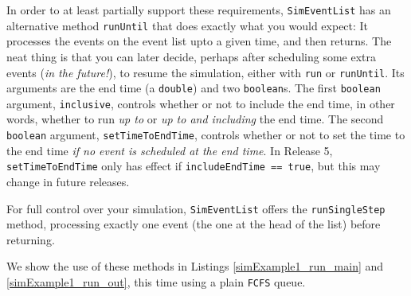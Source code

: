 \documentclass[12pt]{book}
\begin{document}
In order to at least partially support these requirements,
  \lstinline|SimEventList| has an alternative method
  \lstinline|runUntil| that does exactly what you would expect:
  It processes the events on the event list
  upto a given time,
  and then returns.
The neat thing is that you can later decide,
  perhaps after scheduling some extra events
  ({\em in the future!\/}),
  to resume the simulation,
  either with \lstinline|run|
  or \lstinline|runUntil|.
Its arguments are the end time (a \lstinline|double|)
  and two \lstinline|boolean|s.
The first \lstinline|boolean| argument,
  \lstinline|inclusive|,
  controls whether or not to include
  the end time,
  in other words,
  whether to run {\em up to\/}
  or {\em up to and including\/}
  the end time.
The second \lstinline|boolean| argument,
  \lstinline|setTimeToEndTime|,
  controls whether or not to set the
  time to the end time
  {\em if no event is scheduled at the end time}.
In Release 5,
  \lstinline|setTimeToEndTime| only has effect
  if
  \lstinline|includeEndTime == true|,
  but this may change in future releases.

For full control over your simulation,
  \lstinline|SimEventList| offers
  the \lstinline|runSingleStep|
  method, processing
  exactly one event
  (the one at the head of the list)
  before returning.

We show the use of these methods in Listings
  \ref{simExample1_run_main} and \ref{simExample1_run_out},
  this time using a plain \lstinline|FCFS| queue.
\end{document}
